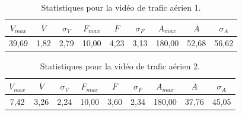 \begin{appendices}
	
\begin{table}
	\centering
	\begin{tabular}{c c c c c c c c c}
		$V_{max}$	& $\overline{V}$	& $\sigma_{V}$	& $F_{max}$	& $\overline{F}$	& $\sigma_{F}$	& $A_{max}$	& $\overline{A}$	& $\sigma_{A}$	\bigstrut[b] \\ \hline

		39,69		& 1,82				& 2,79			& 10,00		& 4,23				& 3,13			& 180,00	& 52,68				& 56,62			\bigstrut[t] \\
	\end{tabular}
	\caption[Statistiques pour la vidéo de trafic aérien 1]{Statistiques pour la vidéo de trafic aérien 1.}
	\label{tab:mhA_stats}
\end{table}

\begin{table}
	\centering
	\begin{tabular}{c c c c c c c c c}
		$V_{max}$	& $\overline{V}$	& $\sigma_{V}$	& $F_{max}$	& $\overline{F}$	& $\sigma_{F}$	& $A_{max}$	& $\overline{A}$	& $\sigma_{A}$	\bigstrut[b] \\ \hline

		7,42		& 3,26				& 2,24			& 10,00		& 3,60				& 2,34			& 180,00	& 37,76				& 45,05			\bigstrut[t] \\
	\end{tabular}
	\caption[Statistiques pour la vidéo de trafic aérien 2]{Statistiques pour la vidéo de trafic aérien 2.}
	\label{tab:germanwingsA_stats}
\end{table}




\end{appendices}
